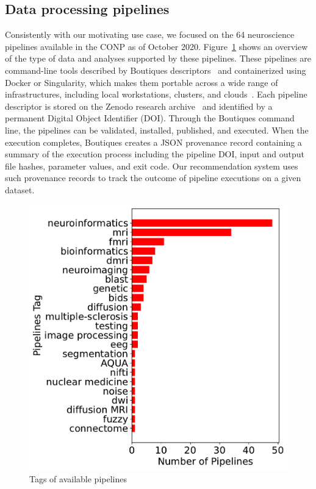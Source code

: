 \documentclass[conference]{IEEEtran}
\begin{document}
\subsection{Data processing pipelines} 
Consistently with our motivating use case, we focused on the 64
neuroscience pipelines available in the CONP as of October
2020. Figure~\ref{fig:pipelines_tags} shows an overview of the type of data
and analyses supported by these pipelines. These pipelines are command-line
tools described by Boutiques descriptors~\cite{glatard2018boutiques} and
containerized using Docker or Singularity, which makes them portable across
a wide range of infrastructures, including local workstations, clusters,
and clouds~\cite{kiar2019serverless}. Each pipeline descriptor is stored on
the Zenodo research archive~\cite{zenodo} and identified by a permanent Digital Object
Identifier (DOI). Through the Boutiques command line, the pipelines can be
validated, installed, published, and executed. When the execution
completes, Boutiques creates a JSON provenance record containing a summary
of the execution process including the pipeline DOI, input and output file
hashes, parameter values, and exit code. Our recommendation system uses
such provenance records to track the outcome of pipeline executions on a
given dataset.
\begin{figure} 
  \includegraphics[width=\columnwidth]{figures/Pipelines Tag.pdf}
  \caption{Tags of available pipelines }
  \label{fig:pipelines_tags}
\end{figure}
\end{document}
